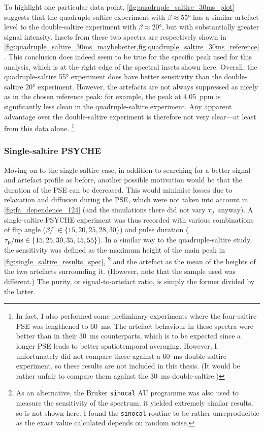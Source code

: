 To highlight one particular data point, \cref{fig:quadruple_saltire_30ms_plot} suggests that the quadruple-saltire experiment with $\beta \approx \ang{55}$ has a similar artefact level to the double-saltire experiment with $\beta \approx \ang{20}$, but with substantially greater signal intensity.
Insets from these two spectra are respectively shown in \cref{fig:quadruple_saltire_30ms_maybebetter,fig:quadruple_saltire_30ms_reference}.
This conclusion does indeed seem to be true for the specific peak used for this analysis, which is at the right edge of the spectral insets shown here.
Overall, the quadruple-saltire \ang{55} experiment does have better sensitivity than the double-saltire \ang{20} experiment.
However, the artefacts are not always suppressed as nicely as in the chosen reference peak: for example, the peak at \qty{4.05}{ppm} is significantly less clean in the quadruple-saltire experiment.
Any apparent advantage over the double-saltire experiment is therefore not very clear---at least from this data alone.%
\footnote{In fact, I also performed some preliminary experiments where the four-saltire PSE was lengthened to \qty{60}{\ms}. The artefact behaviour in these spectra were better than in their \qty{30}{\ms} counterparts, which is to be expected since a longer PSE leads to better spatiotemporal averaging. However, I unfortunately did not compare these against a \qty{60}{\ms} double-saltire experiment, so these results are not included in this thesis. (It would be rather unfair to compare them against the \qty{30}{\ms} double-saltire.)}

\subsubsection{Single-saltire PSYCHE}

Moving on to the single-saltire case, in addition to searching for a better signal and artefact profile as before, another possible motivation would be that the duration of the PSE can be decreased.
This would minimise losses due to relaxation and diffusion during the PSE, which were not taken into account in \cref{fig:fa_dependence_124} (and the simulations there did not vary $\tau_\mathrm{p}$ anyway).
A single-saltire PSYCHE experiment was thus recorded with various combinations of flip angle ($\beta/^\circ \in \{15, 20, 25, 28, 30\}$) and pulse duration ($\tau_\mathrm{p}/\text{ms} \in \{15, 25, 30, 35, 45, 55\}$).
In a similar way to the quadruple-saltire study, the sensitivity was defined as the maximum height of the main peak in \cref{fig:single_saltire_results_spec},%
\footnote{As an alternative, the Bruker \texttt{sinocal} AU programme was also used to measure the sensitivity of the spectrum; it yielded extremely similar results, so is not shown here. I found the \texttt{sinocal} routine to be rather unreproducible as the exact value calculated depends on random noise.}
and the artefact as the mean of the heights of the two artefacts surrounding it.
(However, note that the sample used was different.)
The purity, or signal-to-artefact ratio, is simply the former divided by the latter.

